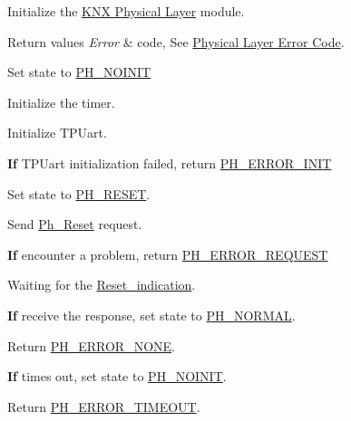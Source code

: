 Initialize the \hyperlink{group___k_n_x___p_h}{K\+NX Physical Layer} module. 


\begin{DoxyRetVals}{Return values}
{\em Error} & code, See \hyperlink{group___p_h___error___code}{Physical Layer Error Code}. \\
\hline
\end{DoxyRetVals}
Set state to \hyperlink{group___k_n_x___p_h___sup___exported___types_gga5b665a94bef912fbfbea7cc949ed0e49a329f30393c5729b777643b93478de68c}{P\+H\+\_\+\+N\+O\+I\+N\+IT}

Initialize the timer.

Initialize T\+P\+Uart.

{\bfseries If} T\+P\+Uart initialization failed, return \hyperlink{group___p_h___error___code_ga15fbdf4edfc98283ef0f1b7c2fc0a47b}{P\+H\+\_\+\+E\+R\+R\+O\+R\+\_\+\+I\+N\+IT}

Set state to \hyperlink{group___k_n_x___p_h___sup___exported___types_gga5b665a94bef912fbfbea7cc949ed0e49a69a4299f68e66ea3fbe9477582ac02cd}{P\+H\+\_\+\+R\+E\+S\+ET}.

Send \hyperlink{group___k_n_x___p_h___sup___exported___types_gga78f5bed722457f025cbc6786d5730d3eaf0efc940702df223316668e6712b5ba4}{Ph\+\_\+\+Reset} request.

{\bfseries If} encounter a problem, return \hyperlink{group___p_h___error___code_ga76393e5665e76130e95c73aab378c53d}{P\+H\+\_\+\+E\+R\+R\+O\+R\+\_\+\+R\+E\+Q\+U\+E\+ST}

Waiting for the \hyperlink{group___u_a_r_t___control___from_gade9c58399a01abdaa03bbecbf63879c3}{Reset\+\_\+indication}.

{\bfseries If} receive the response, set state to \hyperlink{group___k_n_x___p_h___sup___exported___types_gga5b665a94bef912fbfbea7cc949ed0e49a4be7dd56ae47b708c6f4751714efe930}{P\+H\+\_\+\+N\+O\+R\+M\+AL}.

Return \hyperlink{group___p_h___error___code_ga67055c114ec03135c28e1cb6a3d68f5a}{P\+H\+\_\+\+E\+R\+R\+O\+R\+\_\+\+N\+O\+NE}.

{\bfseries If} times out, set state to \hyperlink{group___k_n_x___p_h___sup___exported___types_gga5b665a94bef912fbfbea7cc949ed0e49a329f30393c5729b777643b93478de68c}{P\+H\+\_\+\+N\+O\+I\+N\+IT}.

Return \hyperlink{group___p_h___error___code_gaae8d2172a18fdde6957c77af378c2574}{P\+H\+\_\+\+E\+R\+R\+O\+R\+\_\+\+T\+I\+M\+E\+O\+UT}. 